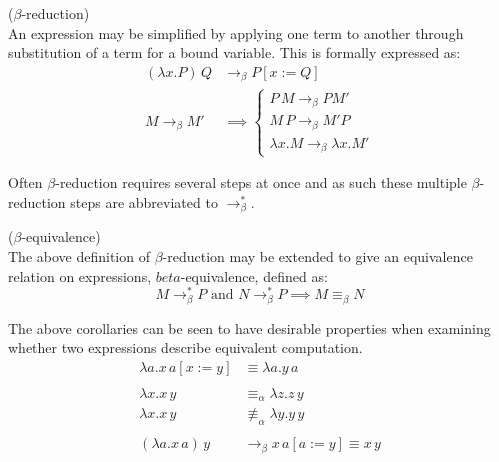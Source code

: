 \documentclass{article}
\begin{document}
        \begin{definition}{($\beta$-reduction)\\}
            An expression may be simplified by applying one term to another through substitution of a term for a bound variable.
            This is formally expressed as:
            \begin{align}
                (\lambda x . P) \, Q   & \rightarrow_\beta P[x := Q] \\
                M \rightarrow_\beta M' & \implies
                    \begin{cases}
                        P \, M \rightarrow_\beta P M' \\
                        M \, P \rightarrow_\beta M' P \\
                        \lambda x . M \rightarrow_\beta \lambda x . M'
                    \end{cases}
            \end{align}
        \end{definition}
        Often $\beta$-reduction requires several steps at once and as such these multiple $\beta$-reduction steps are abbreviated to $\rightarrow_\beta^*$.

        \begin{corollary*}{($\beta$-equivalence)\\}
            The above definition of $\beta$-reduction may be extended to give an equivalence relation on expressions, $beta$-equivalence, defined as:
            \begin{equation}
                M \rightarrow_\beta^* P \text{ and } N \rightarrow_\beta^* P \implies M \equiv_\beta N
            \end{equation}
        \end{corollary*}
        

        \begin{example*}
            The above corollaries can be seen to have desirable properties when examining whether two expressions describe equivalent computation.
            \begin{align*}
                \lambda a . x \, a [x := y] & \equiv \lambda a . y \, a \\
                \\
                \lambda x . x \, y & \equiv_\alpha \lambda z . z \, y \\
                \lambda x . x \, y & \not\equiv_\alpha \lambda y . y \, y \\
                \\
                (\lambda a . x \, a) \, y & \rightarrow_\beta x \, a [a := y] \equiv x \, y
            \end{align*}
        \end{example*}
\end{document}
